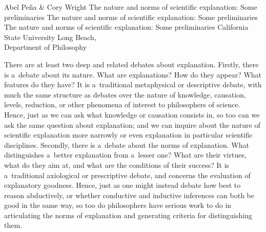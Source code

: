 \begin{editorialeng}{Abel Peña \& Cory Wright}
	{The nature and norms of scientific explanation: Some preliminaries}
	{The nature and norms of scientific explanation: Some preliminaries}
	{The nature and norms of scientific explanation: Some preliminaries}
		{California State University Long Beach,\\Department of Philosophy}
	
	


\lettrine[loversize=0.13,lines=2,lraise=-0.03,nindent=0em,findent=0.2pt]%
{T}{}here are at least two deep and related debates about explanation. Firstly, there is a~debate about its nature. What are explanations? How do they appear? What features do they have? It is a~traditional metaphysical or descriptive debate, with much the same structure as debates over the nature of knowledge, causation, levels, reduction, or other phenomena of interest to philosophers of science. Hence, just as we can ask what knowledge or causation consists in, so too can we ask the same question about explanation; and we can inquire about the nature of scientific explanation more narrowly or even explanation in particular scientific disciplines. Secondly, there is a~debate about the norms of explanation. What distinguishes a~better explanation from a~lesser one? What are their virtues, what do they aim at, and what are the conditions of their success? It is a~traditional axiological or prescriptive debate, and concerns the evaluation of explanatory goodness. Hence, just as one might instead debate how best to reason abductively, or whether conductive and inductive inferences can both be good in the same way, so too do philosophers have serious work to do in articulating the norms of explanation and generating criteria for distinguishing them.


\end{editorialeng}
